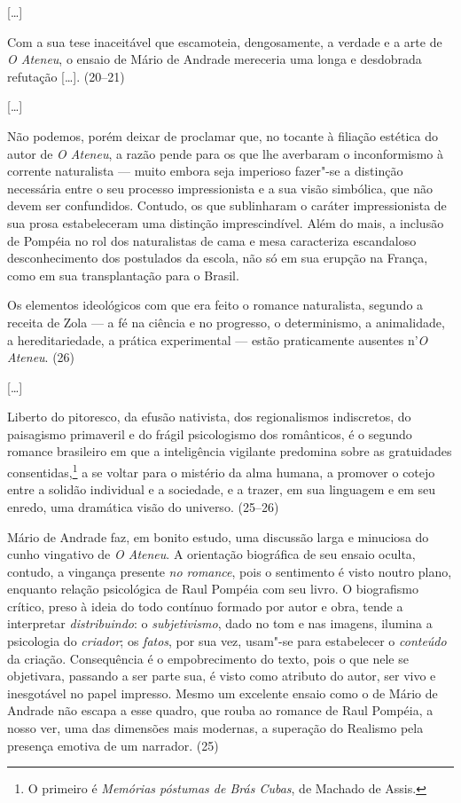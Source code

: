 [\ldots]

Com a sua tese inaceitável que escamoteia, dengosamente,
a verdade e a arte de \textit{O Ateneu}, o
ensaio de Mário de Andrade mereceria uma longa e desdobrada refutação
[\ldots]. (20--21)

[\ldots]

Não podemos, porém deixar de proclamar que, no tocante à
filiação estética do autor de \textit{O Ateneu}, a razão pende para os que lhe averbaram o
inconformismo à corrente naturalista --- muito embora seja imperioso
fazer"-se a distinção necessária entre o seu processo impressionista e
a sua visão simbólica, que não devem ser confundidos. Contudo, os que
sublinharam o caráter impressionista de sua prosa estabeleceram uma
distinção imprescindível. Além do mais, a inclusão de Pompéia no rol
dos naturalistas de cama e mesa caracteriza escandaloso desconhecimento
dos postulados da escola, não só em sua erupção na França, como em sua
transplantação para o Brasil. 

Os elementos ideológicos com que era feito o romance
naturalista, segundo a receita de Zola --- a fé na ciência e no
progresso, o determinismo, a animalidade, a hereditariedade, a prática
experimental --- estão praticamente ausentes n'\textit{O Ateneu}. (26)

[\ldots]

Liberto do pitoresco, da efusão nativista, dos
regionalismos indiscretos, do paisagismo primaveril e do frágil
psicologismo dos românticos, é o segundo romance brasileiro em que a
inteligência vigilante predomina sobre as gratuidades
consentidas,\footnote{O primeiro é \textit{Memórias póstumas de Brás
Cubas}, de Machado de Assis.} a se voltar para o
mistério da alma humana, a promover o cotejo entre a solidão individual
e a sociedade, e a trazer, em sua linguagem e em seu enredo, uma
dramática visão do universo. (25--26)  



Mário de Andrade faz, em bonito estudo, uma discussão
larga e minuciosa do cunho vingativo de \textit{O
Ateneu}. A orientação biográfica de seu ensaio oculta,
contudo, a vingança presente \textit{no
romance}, pois o sentimento é visto noutro plano,
enquanto relação psicológica de Raul Pompéia com seu livro. O
biografismo crítico, preso à ideia do todo contínuo formado por autor e
obra, tende a interpretar
\textit{distribuindo}: o
\textit{subjetivismo}, dado no tom e nas
imagens, ilumina a psicologia do
\textit{criador}; os
\textit{fatos}, por sua vez, usam"-se para
estabelecer o \textit{conteúdo} da criação.
Consequência é o empobrecimento do texto, pois o que nele se
objetivara, passando a ser parte sua, é visto como atributo do autor,
ser vivo e inesgotável no papel impresso. Mesmo um excelente ensaio
como o de Mário de Andrade não escapa a esse quadro, que rouba ao
romance de Raul Pompéia, a nosso ver, uma das dimensões mais modernas,
a superação do Realismo pela presença emotiva de um narrador. (25) 

